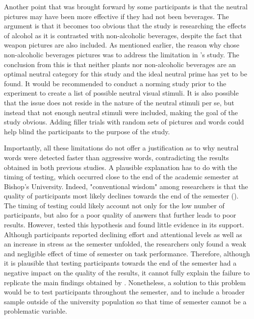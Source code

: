 \documentclass[serif, authordate, twocolumn, empirical]{jote-article}
\begin{document}
Another point that was brought forward by some participants is that the neutral pictures may have been more effective if they had not been beverages. The argument is that it becomes too obvious that the study is researching the effects of alcohol as it is contrasted with non-alcoholic beverages, despite the fact that weapon pictures are also included. As mentioned earlier, the reason why \textcite{SubraMullerBegueLBushmanDelmas2010} chose non-alcoholic beverages pictures was to address the limitation in \textcite{BartholowHeinz2006}'s study. The conclusion from this is that neither plants nor non-alcoholic beverages are an optimal neutral category for this study and the ideal neutral prime has yet to be found. It would be recommended to conduct a norming study prior to the experiment to create a list of possible neutral visual stimuli. It is also possible that the issue does not reside in the nature of the neutral stimuli per se, but instead that not enough neutral stimuli were included, making the goal of the study obvious. Adding filler trials with random sets of pictures and words could help blind the participants to the purpose of the study. 

Importantly, all these limitations do not offer a justification as to why neutral words were detected faster than aggressive words, contradicting the results obtained in both previous studies. A plausible explanation has to do with the timing of testing, which occurred close to the end of the academic semester at Bishop’s University. Indeed, "conventional wisdom" among researchers is that the quality of participants most likely declines towards the end of the semester (\cite{EbersoleAthertonBelangerSkulborstadAllenBanks2016}). The timing of testing could likely account not only for the low number of participants, but also for a poor quality of answers that further leads to poor results. However, \textcite{EbersoleAthertonBelangerSkulborstadAllenBanks2016} tested this hypothesis and found little evidence in its support. Although participants reported declining effort and attentional levels as well as an increase in stress as the semester unfolded, the researchers only found a weak and negligible effect of time of semester on task performance. Therefore, although it is plausible that testing participants towards the end of the semester had a negative impact on the quality of the results, it cannot fully explain the failure to replicate the main findings obtained by \textcite{BartholowHeinz2006}. Nonetheless, a solution to this problem would be to test participants throughout the semester, and to include a broader sample outside of the university population so that time of semester cannot be a problematic variable. 
\end{document}
